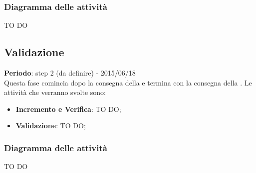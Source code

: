 		\subsubsection{Diagramma delle attività} %
		\label{ssub:diagramma_delle_attivita}
		TO DO
	
	\subsection{Validazione} %
	\label{sub:validazione}
	\textbf{Periodo}:  step 2 (da definire) - 2015/06/18 \\
	Questa fase comincia dopo la consegna della \RQ{} e termina con la consegna della \RA.
	Le attività che verranno svolte sono:
		\begin{itemize}
			\item \textbf{Incremento e Verifica}: TO DO;
			\item \textbf{Validazione}: TO DO;
		\end{itemize}
		
		\subsubsection{Diagramma delle attività} %
		\label{ssub:diagramma_delle_attivita}
		TO DO
	
	
